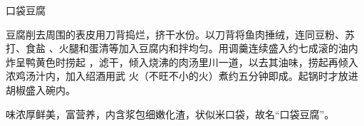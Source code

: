 \begin{recipe}{口袋豆腐}

\ingredients


\cooking

豆腐削去周围的表皮用刀背捣烂，挤干水份。以刀背将鱼肉捶绒，连同豆粉、苏打、食盐
、火腿和蛋清等加入豆腐内和拌均匀。用调羹连续盛入约七成滚的油内炸呈鸭黄色时捞起
，滤干，倾入烧沸的肉汤里川一道，以去其油味，捞起再倾入浓鸡汤汁内，加入绍酒用武
火（不旺不小的火）煮约五分钟即成。起锅时才放进胡椒盛入碗内。

\notes

味浓厚鲜美，富营养，内含浆包细嫩化渣，状似米口袋，故名“口袋豆腐”。

\end{recipe}

